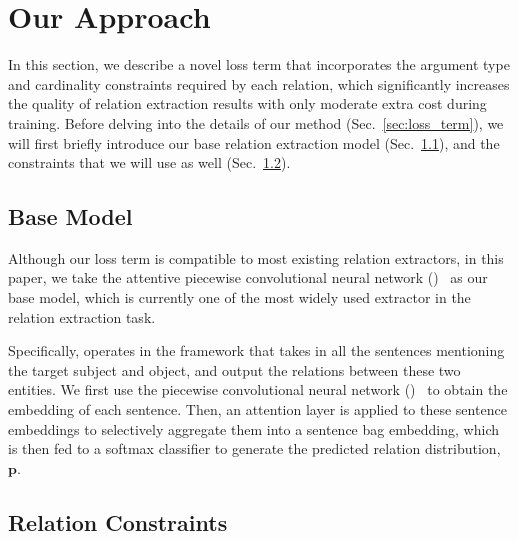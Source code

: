 \section{Our Approach}
In this section, we describe a novel loss term that incorporates the argument type and cardinality constraints required by each relation,
which significantly increases the quality of relation extraction results with only moderate extra cost during training.
Before delving into the details of our method (Sec.~\ref{sec:loss_term}), we will first briefly introduce our base relation extraction model (Sec.~\ref{sec:base_model}), and the constraints that we will use as well (Sec.~\ref{sec:constraints}).





\subsection{Base Model}
\label{sec:base_model}
Although our loss term is compatible to most existing relation extractors, in this paper, we take the attentive piecewise convolutional neural network (\APCNN)~\cite{lin2016neural} as our base model, which is currently one of the most widely used extractor in the relation extraction task.

Specifically, \APCNN operates in the \MIL framework that takes in all the sentences mentioning the target subject and object, and output the relations between these two entities.
We first use the piecewise convolutional neural network (\PCNN)~\cite{zeng2015distant} to obtain the embedding of each sentence.
Then, an attention layer is applied to these sentence embeddings to selectively aggregate them into a sentence bag embedding, which is then fed to a softmax classifier to generate the predicted relation distribution, $\textbf{p}$.



\subsection{Relation Constraints}
\label{sec:constraints}

